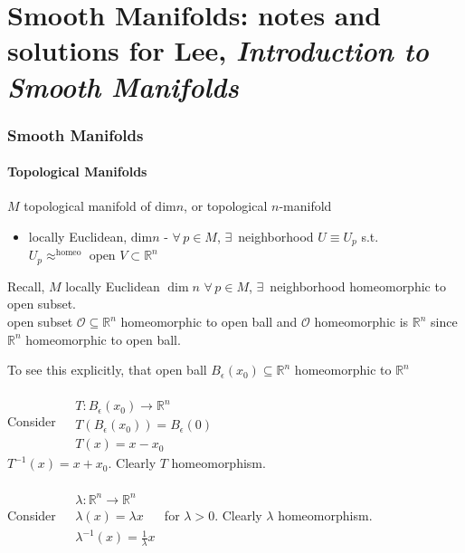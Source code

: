 \part{Smooth Manifolds: notes and solutions for Lee, \emph{Introduction to Smooth Manifolds}}
\section{Smooth Manifolds}
 






\subsection*{Topological Manifolds }

$M$ topological manifold of $\text{dim}{n}$, or topological $n$-manifold 
\begin{itemize}
\item locally Euclidean, $\text{dim}{n}$ - $\forall \, p \in M$, $\exists \, $ neighborhood $U \equiv U_p$ s.t. $U_p \approx^{\text{homeo}} \text{ open } V \subset \mathbb{R}^n$ 
\end{itemize}


 Recall, $M$ locally Euclidean $\dim{n}$ $\forall \, p \in M$, $\exists \,$ neighborhood homeomorphic to open subset. \\
open subset $\mathcal{O} \subseteq \mathbb{R}^n$ homeomorphic to open ball and $\mathcal{O}$ homeomorphic is $\mathbb{R}^n$ since $\mathbb{R}^n$ homeomorphic to open ball.  

To see this explicitly, that open ball $B_{\epsilon}(x_0) \subseteq \mathbb{R}^n $ homeomorphic to $\mathbb{R}^n$

Consider $\begin{aligned} & \quad \\ 
  & T: B_{\epsilon}(x_0) \to \mathbb{R}^n \\ 
  & T(B_{\epsilon}(x_0)) = B_{\epsilon}(0) \\ 
  & T(x) = x- x_0 \end{aligned}$  \\
$T^{-1}(x) = x+x_0$.  Clearly $T$ homeomorphism.  

Consider $\begin{aligned} & \quad \\
& \lambda : \mathbb{R}^n \to \mathbb{R}^n \\
  & \lambda(x) = \lambda x \\
  & \lambda^{-1}(x) = \frac{1}{ \lambda } x \end{aligned}$ for $\lambda >0$.  Clearly $\lambda$ homeomorphism.  

